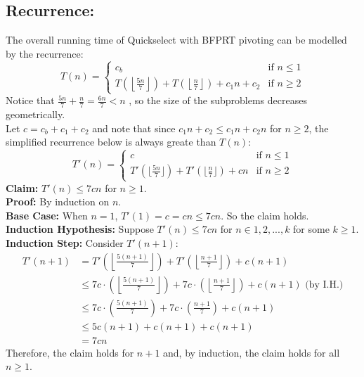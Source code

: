 \documentclass[12pt, b5paper]{article}
\newcommand{\floor}[1]{\left\lfloor #1 \right\rfloor}
\begin{document}
\subsection*{Recurrence:}
The overall running time of Quickselect with BFPRT pivoting can be modelled by the recurrence:
$$
T(n) = 
\begin{cases}
    c_b & \text{if } n \leq 1 \\
    T\left(\floor{\frac{5n}{7}}\right) + T\left(\floor{\frac{n}{7}}\right) + c_1n + c_2 & \text{if } n \geq 2
\end{cases}
$$
Notice that $\frac{5n}{7} + \frac{n}{7} = \frac{6n}{7} < n$ , so the size of the subproblems decreases 
geometrically. \\
Let $c=c_b + c_1 + c_2$ and note that since $c_1n + c_2 \leq c_{1}n + c_{2}n$ for $n\geq 2$, the simplified recurrence below is 
always greate than $T(n)$:
$$
T'(n) = 
\begin{cases}
    c & \text{if } n \leq 1 \\
    T'\left(\lfloor \frac{5n}{7} \rfloor\right) + T'\left(\lfloor\frac{n}{7}\rfloor\right) + cn & \text{if } n \geq 2
\end{cases}
$$
\newline
\textbf{Claim: } $T'(n) \leq 7cn$ for $n \geq 1$. \\
\newline
\textbf{Proof: } By induction on $n$. \\
\newline
\textbf{Base Case: }
When $n=1$, $T'(1) = c = cn \leq 7cn$. So the claim holds. \\
\newline
\textbf{Induction Hypothesis: }
Suppose $T'(n) \leq 7cn$ for $n \in {1, 2, ..., k}$ for some $k \geq 1$. \\
\newline
\textbf{Induction Step: }
Consider $T'(n + 1)$:
\begin{align*}  
T'(n+1) &= T'\left(\floor{\frac{5(n+1)}{7}}\right) + T'\left(\floor{\frac{n+1}{7}}\right) + c(n+1) \\
&\leq 7c \cdot \left(\floor{\frac{5(n+1)}{7}}\right) + 7c \cdot \left(\floor{\frac{n+1}{7}}\right) + c(n+1) \text{ (by I.H.)} \\
&\leq 7c \cdot \left(\frac{5(n+1)}{7}\right) + 7c \cdot \left(\frac{n+1}{7}\right) + c(n+1) \\
&\leq 5c(n+1) + c(n+1) + c(n+1) \\
&= 7cn
\end{align*}
Therefore, the claim holds for $n+1$ and, by induction, the claim holds for all $n\geq1$.
\end{document}
